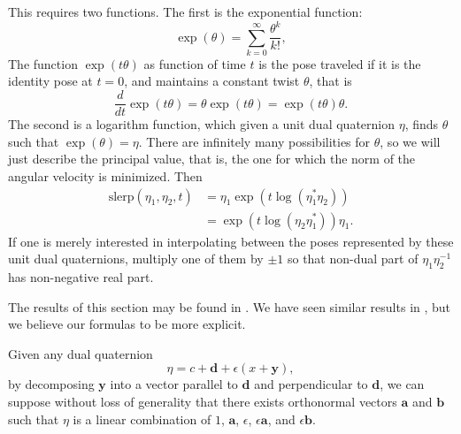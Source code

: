 \documentclass[reqno,12pt]{amsart}
\begin{document}
This requires two functions.  The first is the exponential function:
\begin{equation}
\label{exponential}
\exp(\theta) = \sum_{k=0}^\infty \frac{\theta^k}{k!},
\end{equation}
The function $\exp(t \theta)$ as function of time $t$ is the pose traveled if it is the identity pose at $t = 0$, and maintains a constant twist $\theta$, that is
\begin{equation}
\frac d{dt} \exp(t\theta) = \theta \exp(t\theta) = \exp(t\theta) \theta .
\end{equation}
The second is a logarithm function, which given a unit dual quaternion $\eta$, finds $\theta$ such that $\exp(\theta) = \eta$.  There are infinitely many possibilities for $\theta$, so we will just describe the principal value, that is, the one for which the norm of the angular velocity is minimized.  Then
\begin{equation}
\begin{aligned}
\text{slerp}(\eta_1, \eta_2, t) &= \eta_1 \exp(t \log(\eta_1^* \eta_2)) \\
&= \exp(t \log(\eta_2 \eta_1^*)) \eta_1 .
\end{aligned}
\end{equation}
If one is merely interested in interpolating between the poses represented by these unit dual quaternions, multiply one of them by $\pm 1$ so that non-dual part of $\eta_1 \eta_2^{-1}$ has non-negative real part.

The results of this section may be found in \cite{montgomery-smith}.  We have seen similar results in \cite{selig,wang-et-al,wu-et-al}, but we believe our formulas to be more explicit.

Given any dual quaternion
\begin{equation}
\eta = c + \bm d + \epsilon (x + \bm y),
\end{equation}
by decomposing $\bm y$ into a vector parallel to $\bm d$ and perpendicular to $\bm d$, we can suppose without loss of generality that there exists orthonormal vectors $\bm a$ and $\bm b$ such that $\eta$ is a linear combination of $1$, $\bm a$, $\epsilon$, $\epsilon \bm a$, and $\epsilon \bm b$.
\end{document}
